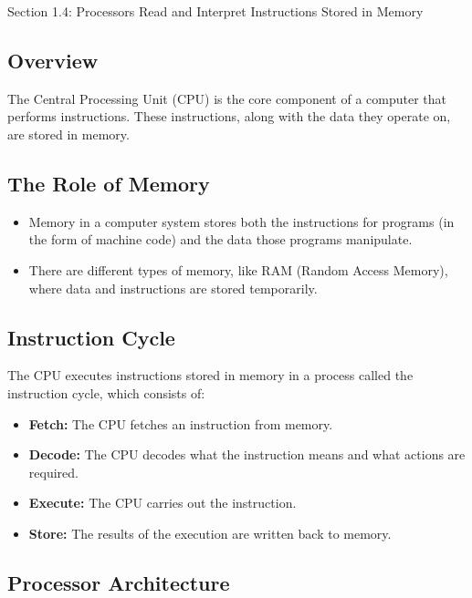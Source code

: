 \begin{notes}{Section 1.4: Processors Read and Interpret Instructions Stored in Memory}
    \subsection*{Overview}
    The Central Processing Unit (CPU) is the core component of a computer that performs instructions. These instructions, along with the data they operate on, are stored in memory. \vspace*{1em}
    
    \subsection*{The Role of Memory}

    \begin{itemize}
        \item Memory in a computer system stores both the instructions for programs (in the form of machine code) and the data those programs manipulate.
        \item There are different types of memory, like RAM (Random Access Memory), where data and instructions are stored temporarily.
    \end{itemize}
    
    \subsection*{Instruction Cycle}

    The CPU executes instructions stored in memory in a process called the instruction cycle, which consists of:

    \begin{itemize}
        \item \textbf{Fetch:} The CPU fetches an instruction from memory.
        \item \textbf{Decode:} The CPU decodes what the instruction means and what actions are required.
        \item \textbf{Execute:} The CPU carries out the instruction.
        \item \textbf{Store:} The results of the execution are written back to memory.
    \end{itemize}
    
    \subsection*{Processor Architecture}


\end{notes}
